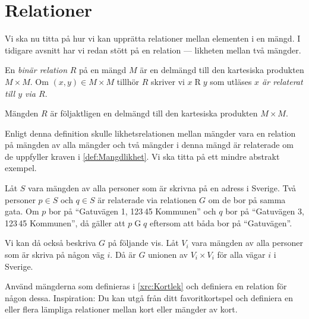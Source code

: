 \section{Relationer}\label{Relationer}

Vi ska nu titta på hur vi kan upprätta relationer mellan
elementen i en mängd.
I tidigare avsnitt har vi redan stött på en relation --- likheten mellan två
mängder.

\begin{definition}\label{def:BinarRelation}
  En \emph{binär relation} \(R\) på en mängd \(M\) är en delmängd till den
  kartesiska produkten \(M\times M\).
  Om \((x,y)\in M\times M\) tillhör \(R\) skriver vi \(x\mathop R y\) som 
  utläses
  \emph{\(x\) är relaterat till \(y\) via \(R\)}.
\end{definition}

\begin{remark}\label{RelationDelmangdTillKartesiskProdukt}
  Mängden \(R\) är följaktligen en delmängd till den kartesiska produkten
  \(M\times M\).
\end{remark}

Enligt denna definition skulle likhetsrelationen mellan mängder vara en
relation på mängden av alla mängder och två mängder i denna mängd är relaterade
om de uppfyller kraven i \cref{def:Mangdlikhet}.
Vi ska titta på ett mindre abstrakt exempel.
\begin{example}
  Låt \(S\) vara mängden av alla personer som är skrivna på en adress i
  Sverige.
  Två personer \(p\in S\) och \(q\in S\) är relaterade via relationen \(G\)
  om de bor på samma gata.
  Om \(p\) bor på \enquote{Gatuvägen 1, 123\,45 Kommunen} och \(q\) bor på
  \enquote{Gatuvägen 3, 123\,45 Kommunen}, då gäller att \(p\mathop G q\) 
  eftersom att båda bor på \enquote{Gatuvägen}.

  Vi kan då också beskriva \(G\) på följande vis.
  Låt \(V_i\) vara mängden av alla personer som är skriva på någon väg \(i\).
  Då är \(G\) unionen av \(V_i\times V_i\) för alla vägar \(i\) i Sverige.
\end{example}

\begin{exercise}
  Använd mängderna som definieras i \cref{xrc:Kortlek} och definiera en
  relation för någon dessa.
  Inspiration: Du kan utgå från ditt favoritkortspel och definiera en eller
  flera lämpliga relationer mellan kort eller mängder av kort.
\end{exercise}



